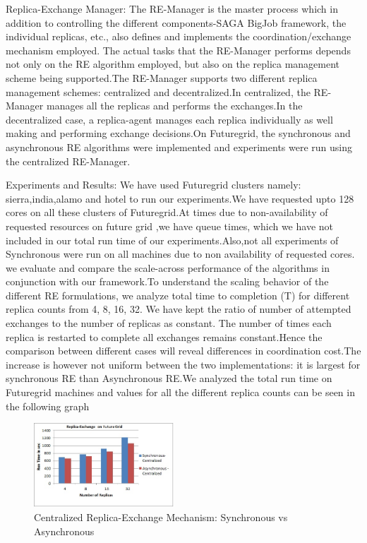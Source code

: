 \documentclass[]{paper}
\begin{document}
Replica-Exchange Manager:
The RE-Manager is the master process which in addition to controlling the different components-SAGA BigJob framework, the individual replicas, etc., also defines and implements the coordination/exchange mechanism employed. The actual tasks that the RE-Manager performs depends not only on the RE algorithm employed, but also on the replica management scheme being supported.The RE-Manager supports two different replica management schemes: centralized and decentralized.In centralized, the RE-Manager manages all the replicas and performs the exchanges.In the decentralized case, a replica-agent manages each replica individually as well making and performing exchange decisions.On Futuregrid, the synchronous and asynchronous RE algorithms were implemented and experiments were run using the centralized RE-Manager.

Experiments and Results:
We have used Futuregrid clusters namely: sierra,india,alamo and hotel to run our experiments.We have requested upto 128 cores on all these clusters of Futuregrid.At times due to non-availability of requested resources on future grid ,we have queue times, which we have not included in our total run time of our experiments.Also,not all experiments of Synchronous were run on all machines due to non availability of requested cores. we evaluate and compare the scale-across performance of the algorithms in conjunction with our framework.To understand the scaling behavior of the different RE formulations, we analyze total time to completion (T) for different replica counts from 4, 8, 16, 32. We have kept the ratio of number of attempted exchanges to the number of replicas as constant. The number of times each replica is restarted to complete all exchanges remains constant.Hence the comparison between different cases will reveal differences in coordination cost.The increase is however not uniform between the two 
implementations: it is largest for synchronous RE than Asynchronous RE.We analyzed the total run time on Futuregrid machines and values for all the different replica counts can be seen in the following graph
\begin{figure}[t]
	\centering
		\includegraphics[width=0.47\textwidth]{figures/replica-exchange.jpg}
\caption{Centralized Replica-Exchange Mechanism: Synchronous vs Asynchronous} 	
\label{figure(i)}
\end{figure}		
\end{document}
